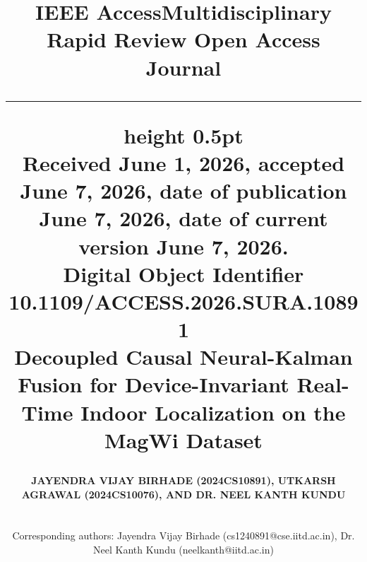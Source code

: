 \documentclass[journal,twoside,compsoc]{IEEEtran}
\begin{document}
\title{
    \vspace{-1.8cm}
    \noindent\textsf{\color{accessblue}\LARGE\bfseries IEEE Access}\hfill\textsf{\color{accessgrey}\scriptsize Multidisciplinary Rapid Review Open Access Journal}\\
    \vspace{-0.15cm}
    \hrule height 0.5pt\hfill\\
    \vspace{0.1cm}
    \noindent\textsf{\color{accessgrey}\scriptsize Received June 1, 2026, accepted June 7, 2026, date of publication June 7, 2026, date of current version June 7, 2026.}\\
    \noindent\textsf{\color{accessgrey}\scriptsize Digital Object Identifier 10.1109/ACCESS.2026.SURA.10891}\\
    \vspace{0.4cm}
    \color{accessblue}\Huge\bfseries\sffamily Decoupled Causal Neural-Kalman Fusion for Device-Invariant Real-Time Indoor Localization on the MagWi Dataset
}

\author{
    \uppercase{\textbf{Jayendra Vijay Birhade (2024CS10891), Utkarsh Agrawal (2024CS10076), and Dr. Neel Kanth Kundu}}\\
    \vspace{0.15cm}
    \\
    \\
    \small Corresponding authors: Jayendra Vijay Birhade (cs1240891@cse.iitd.ac.in), Dr. Neel Kanth Kundu (neelkanth@iitd.ac.in)
}
\end{document}

